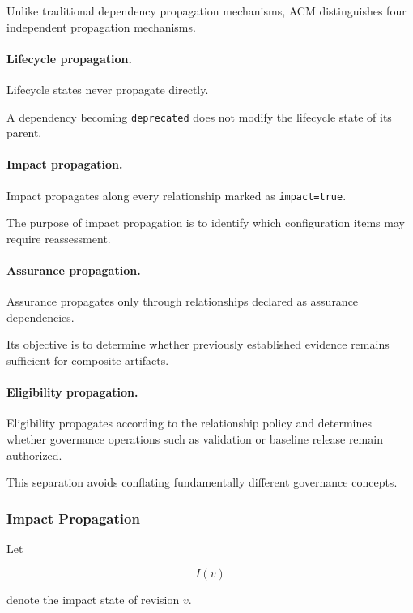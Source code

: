 \documentclass[10pt]{article}
\begin{document}
Unlike traditional dependency propagation mechanisms, ACM distinguishes four
independent propagation mechanisms.

\paragraph{Lifecycle propagation.}

Lifecycle states never propagate directly.

A dependency becoming
\texttt{deprecated}
does not modify the lifecycle state of its parent.

\paragraph{Impact propagation.}

Impact propagates along every relationship marked as
\texttt{impact=true}.

The purpose of impact propagation is to identify which configuration items may
require reassessment.

\paragraph{Assurance propagation.}

Assurance propagates only through relationships declared as assurance
dependencies.

Its objective is to determine whether previously established evidence remains
sufficient for composite artifacts.

\paragraph{Eligibility propagation.}

Eligibility propagates according to the relationship policy and determines
whether governance operations such as validation or baseline release remain
authorized.

This separation avoids conflating fundamentally different governance concepts.

\subsubsection{Impact Propagation}

Let

\[
I(v)
\]

denote the impact state of revision
$v$.
\end{document}
